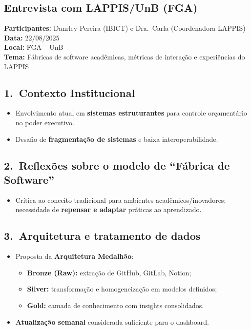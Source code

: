 \documentclass[
	12pt,
	openright,
	oneside,
	a4paper,
	brazil
]{abntex2}
\begin{document}


\begin{apendicesenv}
\partapendices

\chapter{Entrevista com LAPPIS/UnB (FGA)}
\label{apendiceA}

\textbf{Participantes:} Danrley Pereira (IBICT) e Dra.\ Carla (Coordenadora LAPPIS) \\
\textbf{Data:} 22/08/2025 \\
\textbf{Local:} FGA -- UnB \\
\textbf{Tema:} Fábricas de software acadêmicas, métricas de interação e experiências do LAPPIS

\section*{1.\ Contexto Institucional}
\begin{itemize}
\item Envolvimento atual em \textbf{sistemas estruturantes} para controle orçamentário no poder executivo.
\item Desafio de \textbf{fragmentação de sistemas} e baixa interoperabilidade.
\end{itemize}

\section*{2.\ Reflexões sobre o modelo de ``Fábrica de Software''}
\begin{itemize}
\item Crítica ao conceito tradicional para ambientes acadêmicos/inovadores; necessidade de \textbf{repensar e adaptar} práticas ao aprendizado.
\end{itemize}

\section*{3.\ Arquitetura e tratamento de dados}
\begin{itemize}
\item Proposta da \textbf{Arquitetura Medalhão}:
\begin{itemize}
\item \textbf{Bronze (Raw):} extração de GitHub, GitLab, Notion;
\item \textbf{Silver:} transformação e homogeneização em modelos definidos;
\item \textbf{Gold:} camada de conhecimento com insights consolidados.
\end{itemize}
\item \textbf{Atualização semanal} considerada suficiente para o dashboard.
\end{itemize}


\end{apendicesenv}
\end{document}
